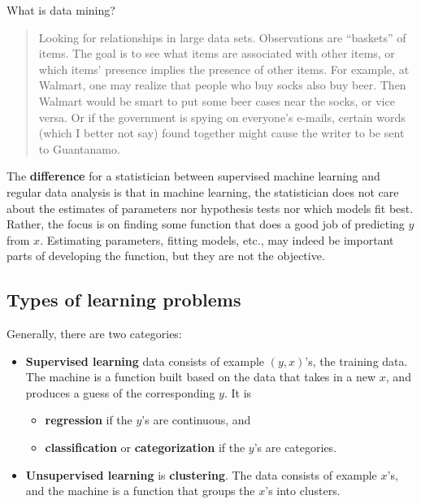 \documentclass[
]{book}
\begin{document}
What is data mining?

\begin{quote}
Looking for relationships in large data sets. Observations are ``baskets'' of items. The goal is to see what items are associated with other items, or which items' presence implies the presence of other items. For example, at Walmart, one may realize that people who buy socks also buy beer. Then Walmart would be smart to put some beer cases near the socks, or vice versa. Or if the government is spying on everyone's e-mails, certain words (which I better not say) found together might cause the writer to be sent to Guantanamo.
\end{quote}

The \textbf{difference} for a statistician between supervised machine learning and regular data analysis is that in machine learning, the statistician does not care about the estimates of parameters nor hypothesis tests nor which models fit best. Rather, the focus is on finding some function that does a good job of predicting \(y\) from \(x\). Estimating parameters, fitting models, etc., may indeed be important parts of developing the function, but they are not the objective.

\hypertarget{types-of-learning-problems}{%
\subsection{Types of learning problems}\label{types-of-learning-problems}}

Generally, there are two categories:

\begin{itemize}
\item
  \textbf{Supervised learning} data consists of example \((y,x)\)'s, the training data. The machine is a function built based on the data that takes in a new \(x\), and produces a guess of the corresponding \(y\). It is

  \begin{itemize}
  \item
    \textbf{regression} if the \(y\)'s are continuous, and
  \item
    \textbf{classification} or \textbf{categorization} if the \(y\)'s are categories.
  \end{itemize}
\item
  \textbf{Unsupervised learning} is \textbf{clustering}. The data consists of example \(x\)'s, and the machine is a function that groups the \(x\)'s into clusters.
\end{itemize}
\end{document}
